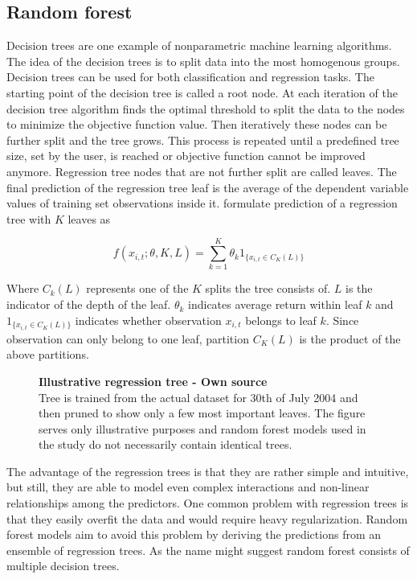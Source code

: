 \documentclass[12pt]{article}
\begin{document}
\subsection{Random forest}

Decision trees are one example of nonparametric machine learning algorithms. The idea of the decision trees is to split data into the most homogenous groups. Decision trees can be used for both classification and regression tasks. The starting point of the decision tree is called a root node. At each iteration of the decision tree algorithm finds the optimal threshold to split the data to the nodes to minimize the objective function value. Then iteratively these nodes can be further split and the tree grows. This process is repeated until a predefined tree size, set by the user, is reached or objective function cannot be improved anymore. Regression tree nodes that are not further split are called leaves. The final prediction of the regression tree leaf is the average of the dependent variable values of training set observations inside it. \citet{guetal} formulate prediction of a regression tree with $K$ leaves as \par

\begin{equation}
f(x_{i, t}; \theta, K, L) = \sum_{k=1}^K \theta_k 1 _{\{x_{i, t} \in C_K(L)\}}
\end{equation}

Where $C_k(L)$ represents one of the $K$ splits the tree consists of. $L$ is the indicator of the depth of the leaf. $\theta_k$ indicates average return within leaf $k$ and $1 _{\{x_{i, t} \in C_K(L)\}}$ indicates whether observation $x_{i, t}$ belongs to leaf $k$. Since observation can only belong to one leaf, partition $C_K(L)$ is the product of the above partitions. \par

\begin{figure}[ht]
\centering
\caption[Illustrative regression tree]{\textbf{Illustrative regression tree \textnormal{- Own source}}\\ Tree is trained from the actual dataset for 30th of July 2004 and then pruned to show only a few most important leaves. The figure serves only illustrative purposes and random forest models used in the study do not necessarily contain identical trees. }

\label{plot:regre_tree}
\end{figure}

The advantage of the regression trees is that they are rather simple and intuitive, but still, they are able to model even complex interactions and non-linear relationships among the predictors. One common problem with regression trees is that they easily overfit the data and would require heavy regularization. Random forest models aim to avoid this problem by deriving the predictions from an ensemble of regression trees. As the name might suggest random forest consists of multiple decision trees. \par
\end{document}

